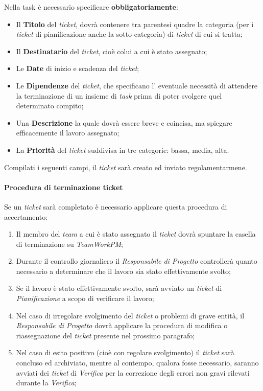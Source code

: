 Nella task è necessario specificare \textbf{obbligatoriamente}:
\begin{itemize}
\item Il \textbf{Titolo} del \textit{ticket}, dovrà contenere tra parentesi quadre la categoria (per i \textit{ticket} di pianificazione anche la sotto-categoria) di \textit{ticket} di cui si tratta;
\item Il \textbf{Destinatario} del \textit{ticket}, cioè colui a cui è stato assegnato;
\item Le \textbf{Date} di inizio e scadenza del \textit{ticket};
\item Le \textbf{Dipendenze} del \textit{ticket}, che specificano l' eventuale necessità di attendere la terminazione di un insieme di \textit{task} prima di poter svolgere quel determinato compito;
\item Una \textbf{Descrizione} la quale dovrà essere breve e coincisa, ma spiegare efficacemente il lavoro assegnato;
\item La \textbf{Priorità} del \textit{ticket} suddivisa in tre categorie: bassa, media, alta.
\end{itemize}

Compilati i seguenti campi, il \textit{ticket} sarà creato ed inviato regolamentarmene.

\paragraph{Procedura di terminazione ticket}
Se un \textit{ticket} sarà completato è necessario applicare questa procedura di accertamento:
\begin{enumerate}
\item Il membro del \textit{team} a cui è stato assegnato il \textit{ticket} dovrà spuntare la casella di terminazione su \textit{TeamWorkPM};
\item Durante il controllo giornaliero il \textit{Responsabile di Progetto} controllerà quanto necessario a determinare che il lavoro sia stato effettivamente svolto;
\item Se il lavoro è stato effettivamente svolto, sarà avviato un \textit{ticket} di \emph{Pianificazione} a scopo di verificare il lavoro;
\item Nel caso di irregolare svolgimento del \textit{ticket} o problemi di grave entità, il \textit{Responsabile di Progetto} dovrà applicare la procedura di modifica o riassegnazione del \textit{ticket} presente nel prossimo paragrafo;
\item Nel caso di esito positivo (cioè con regolare svolgimento) il \textit{ticket} sarà concluso ed archiviato, mentre al contempo, qualora fosse necessario, saranno avviati dei \textit{ticket} di \emph{Verifica} per la correzione degli errori non gravi rilevati durante la \textit{Verifica};

\end{enumerate}

